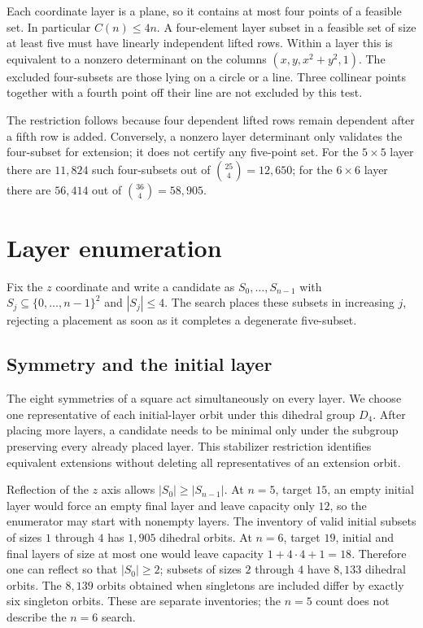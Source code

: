 \documentclass[11pt,a4paper]{article}
\begin{document}
Each coordinate layer is a plane, so it contains at most four points of a feasible set. In particular $C(n)\le4n$. A four-element layer subset in a feasible set of size at least five must have linearly independent lifted rows. Within a layer this is equivalent to a nonzero determinant on the columns $(x,y,x^2+y^2,1)$. The excluded four-subsets are those lying on a circle or a line. Three collinear points together with a fourth point off their line are not excluded by this test.

The restriction follows because four dependent lifted rows remain dependent after a fifth row is added. Conversely, a nonzero layer determinant only validates the four-subset for extension; it does not certify any five-point set. For the $5\times5$ layer there are $11{,}824$ such four-subsets out of $\binom{25}{4}=12{,}650$; for the $6\times6$ layer there are $56{,}414$ out of $\binom{36}{4}=58{,}905$.

\section{Layer enumeration}\label{sec:method}
Fix the $z$ coordinate and write a candidate as $S_0,\ldots,S_{n-1}$ with $S_j\subseteq\{0,\ldots,n-1\}^2$ and $|S_j|\le4$. The search places these subsets in increasing $j$, rejecting a placement as soon as it completes a degenerate five-subset.

\subsection{Symmetry and the initial layer}
The eight symmetries of a square act simultaneously on every layer. We choose one representative of each initial-layer orbit under this dihedral group $D_4$. After placing more layers, a candidate needs to be minimal only under the subgroup preserving every already placed layer. This stabilizer restriction identifies equivalent extensions without deleting all representatives of an extension orbit.

Reflection of the $z$ axis allows $|S_0|\ge|S_{n-1}|$. At $n=5$, target $15$, an empty initial layer would force an empty final layer and leave capacity only $12$, so the enumerator may start with nonempty layers. The inventory of valid initial subsets of sizes $1$ through $4$ has $1{,}905$ dihedral orbits. At $n=6$, target $19$, initial and final layers of size at most one would leave capacity $1+4\cdot4+1=18$. Therefore one can reflect so that $|S_0|\ge2$; subsets of sizes $2$ through $4$ have $8{,}133$ dihedral orbits. The $8{,}139$ orbits obtained when singletons are included differ by exactly six singleton orbits. These are separate inventories; the $n=5$ count does not describe the $n=6$ search.
\end{document}
